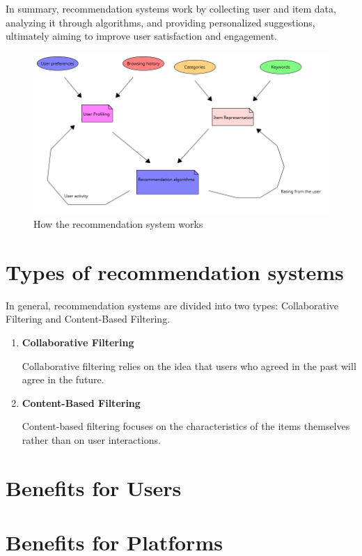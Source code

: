 \documentclass[10pt,twoside,slovak,a4paper]{article}
\begin{document}
In summary, recommendation systems work by collecting user and item data, analyzing it through algorithms, and providing personalized suggestions, ultimately aiming to improve user satisfaction and engagement.
\newline


 \begin{figure}[!h]
    \centering
    \includegraphics[width=0.7\linewidth]{Diagram 2.png}
    \caption{How the recommendation system works}
    \label{fig:picture}
\end{figure}
 



\section{Types of recommendation systems} \label{Types of recommendation systems}

In general, recommendation systems are divided into two types: Collaborative Filtering and Content-Based Filtering.

\begin{enumerate}
\item  \textbf{Collaborative Filtering}

Collaborative filtering relies on the idea that users who agreed in the past will agree in the future.
\item  \textbf{Content-Based Filtering}

Content-based filtering focuses on the characteristics of the items themselves rather than on user interactions.
	
\end{enumerate}


\section{Benefits for Users} \label{Benefits for Users}


\section{Benefits for Platforms} \label{Benefits for Platforms}
\end{document}
